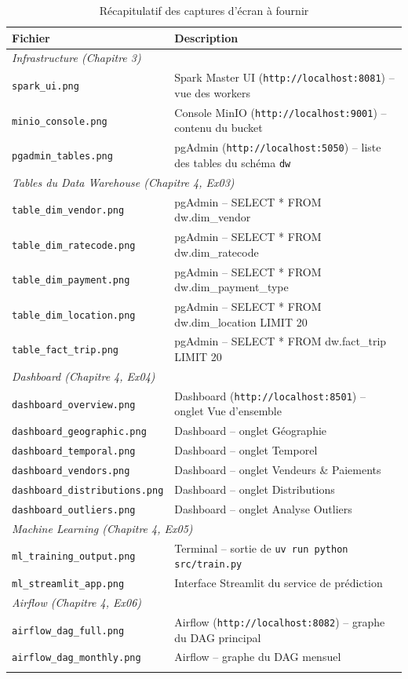 \documentclass[12pt,a4paper]{report}
\begin{document}
\begin{longtable}{@{}lp{8cm}@{}}
\toprule
\textbf{Fichier} & \textbf{Description} \\
\midrule
\endhead
\multicolumn{2}{l}{\textit{Infrastructure (Chapitre 3)}} \\
\midrule
\texttt{spark\_ui.png} & Spark Master UI (\texttt{http://localhost:8081}) -- vue des workers \\
\texttt{minio\_console.png} & Console MinIO (\texttt{http://localhost:9001}) -- contenu du bucket \\
\texttt{pgadmin\_tables.png} & pgAdmin (\texttt{http://localhost:5050}) -- liste des tables du schéma \texttt{dw} \\
\midrule
\multicolumn{2}{l}{\textit{Tables du Data Warehouse (Chapitre 4, Ex03)}} \\
\midrule
\texttt{table\_dim\_vendor.png} & pgAdmin -- SELECT * FROM dw.dim\_vendor \\
\texttt{table\_dim\_ratecode.png} & pgAdmin -- SELECT * FROM dw.dim\_ratecode \\
\texttt{table\_dim\_payment.png} & pgAdmin -- SELECT * FROM dw.dim\_payment\_type \\
\texttt{table\_dim\_location.png} & pgAdmin -- SELECT * FROM dw.dim\_location LIMIT 20 \\
\texttt{table\_fact\_trip.png} & pgAdmin -- SELECT * FROM dw.fact\_trip LIMIT 20 \\
\midrule
\multicolumn{2}{l}{\textit{Dashboard (Chapitre 4, Ex04)}} \\
\midrule
\texttt{dashboard\_overview.png} & Dashboard (\texttt{http://localhost:8501}) -- onglet Vue d'ensemble \\
\texttt{dashboard\_geographic.png} & Dashboard -- onglet Géographie \\
\texttt{dashboard\_temporal.png} & Dashboard -- onglet Temporel \\
\texttt{dashboard\_vendors.png} & Dashboard -- onglet Vendeurs \& Paiements \\
\texttt{dashboard\_distributions.png} & Dashboard -- onglet Distributions \\
\texttt{dashboard\_outliers.png} & Dashboard -- onglet Analyse Outliers \\
\midrule
\multicolumn{2}{l}{\textit{Machine Learning (Chapitre 4, Ex05)}} \\
\midrule
\texttt{ml\_training\_output.png} & Terminal -- sortie de \texttt{uv run python src/train.py} \\
\texttt{ml\_streamlit\_app.png} & Interface Streamlit du service de prédiction \\
\midrule
\multicolumn{2}{l}{\textit{Airflow (Chapitre 4, Ex06)}} \\
\midrule
\texttt{airflow\_dag\_full.png} & Airflow (\texttt{http://localhost:8082}) -- graphe du DAG principal \\
\texttt{airflow\_dag\_monthly.png} & Airflow -- graphe du DAG mensuel \\
\bottomrule
\caption{Récapitulatif des captures d'écran à fournir}
\end{longtable}

\end{document}
